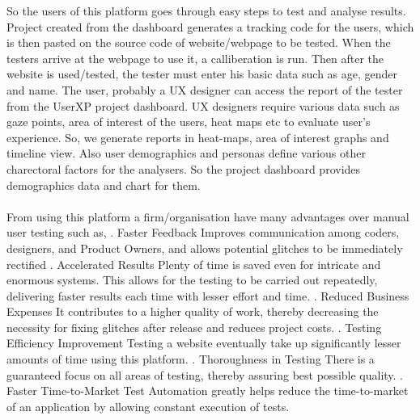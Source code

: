 \documentclass[hidelinks,12pt,a4paper,final]{extreport}
\begin{document}
So the users of this platform goes through easy steps to test and analyse results. Project created from the dashboard generates a tracking code for the users, which is then pasted on the source code of website/webpage to be tested.
When the testers arrive at the webpage to use it, a calliberation is run. Then after the website is used/tested, the tester must enter his basic data such as age, gender and name. The user, probably a UX designer can access the report of the tester from the UserXP project dashboard. 
UX designers require various data such as gaze points, area of interest of the users, heat maps etc to evaluate user's experience. So, we generate reports in heat-maps, area of interest graphs and timeline view. 
Also user demographics and personas define various other charectoral factors for the analysers. So the project dashboard provides demographics data and chart for them. 
\noindent
\paragraph{}
From using this platform a firm/organisation have many advantages over manual user testing such as,
. Faster Feedback\newline
Improves communication among coders, designers, and Product Owners, and allows potential glitches to be immediately rectified
. Accelerated Results\newline
Plenty of time is saved even for intricate and enormous systems. This allows for the testing to be carried out repeatedly, delivering faster results each time with lesser effort and time.
. Reduced Business Expenses\newline
It contributes to a higher quality of work, thereby decreasing the necessity for fixing glitches after release and reduces project costs.
. Testing Efficiency Improvement\newline
Testing a website eventually take up significantly lesser amounts of time using this platform. 
. Thoroughness in Testing\newline
There is a guaranteed focus on all areas of testing, thereby assuring best possible quality.
. Faster Time-to-Market\newline
Test Automation greatly helps reduce the time-to-market of an application by allowing constant execution of tests. 
\end{document}
